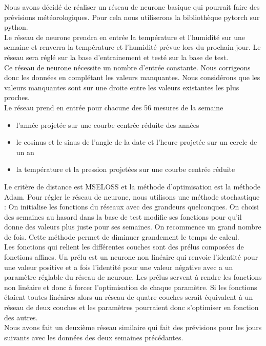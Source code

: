 \documentclass[11pt,a4paper]{article}
\begin{document}
Nous avons décidé de réaliser un réseau de neurone basique qui pourrait faire des prévisions météorologiques. Pour cela nous utiliserons la bibliothèque pytorch sur python.\\
Le réseau de neurone prendra en entrée la température et l'humidité sur une semaine et renverra la température et l'humidité prévue lors du prochain jour. Le réseau sera réglé sur la base d'entrainement et testé sur la base de test.\\
Ce réseau de neurone nécessite un nombre d'entrée constante. Nous corrigeons donc les données en complétant les valeurs manquantes. Nous considérons que les valeurs manquantes sont sur une droite entre les valeurs existantes les plus proches.\\
Le réseau prend en entrée pour chacune des 56 mesures de la semaine 
\begin{itemize}
\item  l'année projetée sur une courbe centrée réduite des années
\item  le cosinus et le sinus de l'angle de la date et l'heure projetée sur un cercle de un an
\item  la température et la pression projetées sur une courbe centrée réduite
\end{itemize}
Le critère de distance est MSELOSS et la méthode d'optimisation est la méthode Adam.
Pour régler le réseau de neurone, nous utilisons une méthode stochastique : 
On initialise les fonctions du réseaux avec des grandeurs quelconques.
On choisi des semaines au hasard dans la base de test modifie ses fonctions pour qu'il donne des valeurs plus juste pour ses semaines. On recommence un grand nombre de fois. Cette méthode permet de diminuer grandement le temps de calcul.\\
Les fonctions qui relient les différentes couches sont des prélus composées de fonctions affines. Un prélu est un neurone non linéaire qui renvoie l'identité pour une valeur positive et a fois l'identité pour une valeur négative avec a un paramètre réglable du réseau de neurone. Les prélus servent à rendre les fonctions non linéaire et donc à forcer l'optimisation de chaque paramètre. Si les fonctions étaient toutes linéaires alors un réseau de quatre couches serait équivalent à un réseau de deux couches et les paramètres pourraient donc s'optimiser en fonction des autres.\\
Nous avons fait un deuxième réseau similaire qui fait des prévisions pour les jours suivants avec les données des deux semaines précédantes.\\
\end{document}
